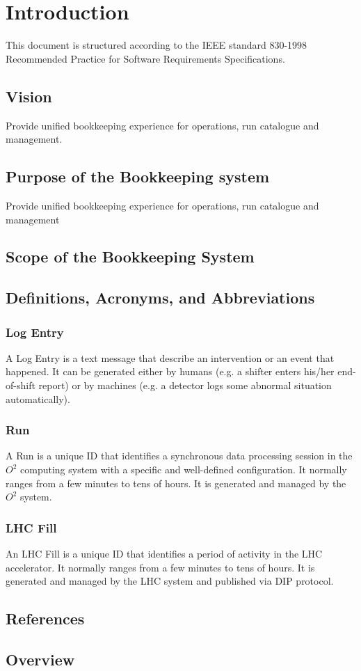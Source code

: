 
\chapter{Introduction}
This document is structured according to the IEEE standard 830-1998 Recommended Practice for Software Requirements Specifications.

\section{Vision}
 Provide unified bookkeeping experience for operations, run catalogue and management.
 
\section{Purpose of the Bookkeeping system}
 Provide unified bookkeeping experience for operations, run catalogue and management 

\section{Scope of the Bookkeeping System}

\section{Definitions, Acronyms, and Abbreviations}

\subsection{Log Entry}
A Log Entry is a text message that describe an intervention or an event that happened. It can be generated either by humans (e.g. a shifter enters his/her end-of-shift report) or by machines (e.g. a detector logs some abnormal situation automatically). 

\subsection{Run}
A Run is a unique ID that identifies a synchronous data processing session in the $O^2$ computing system with a specific and well-defined configuration. It normally ranges from a few minutes to tens of hours. It is generated and managed by the $O^2$ system. 

\subsection{LHC Fill}
An LHC Fill is a unique ID that identifies a period of activity in the LHC accelerator. It normally ranges from a few minutes to tens of hours. It is generated and managed by the LHC system and published via DIP protocol. 


\section{References}

\section{Overview}
